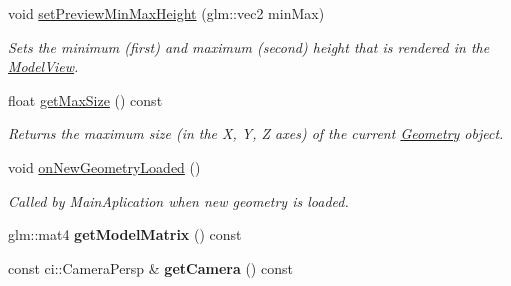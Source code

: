 \begin{DoxyCompactItemize}
\mbox{\label{classpepr3d_1_1_model_view_ac813369be27a029b6f2ecf32eae5c612}} 
void \mbox{\hyperlink{classpepr3d_1_1_model_view_ac813369be27a029b6f2ecf32eae5c612}{set\+Preview\+Min\+Max\+Height}} (glm\+::vec2 min\+Max)
\begin{DoxyCompactList}\small\item\em Sets the minimum (first) and maximum (second) height that is rendered in the \mbox{\hyperlink{classpepr3d_1_1_model_view}{Model\+View}}. \end{DoxyCompactList}\item 
\mbox{\label{classpepr3d_1_1_model_view_af9f8bb7d19cca89bc4cdfc8f958c0eaa}} 
float \mbox{\hyperlink{classpepr3d_1_1_model_view_af9f8bb7d19cca89bc4cdfc8f958c0eaa}{get\+Max\+Size}} () const
\begin{DoxyCompactList}\small\item\em Returns the maximum size (in the X, Y, Z axes) of the current \mbox{\hyperlink{classpepr3d_1_1_geometry}{Geometry}} object. \end{DoxyCompactList}\item 
\mbox{\label{classpepr3d_1_1_model_view_a324a3111305b1a127e61e628b1a8e066}} 
void \mbox{\hyperlink{classpepr3d_1_1_model_view_a324a3111305b1a127e61e628b1a8e066}{on\+New\+Geometry\+Loaded}} ()
\begin{DoxyCompactList}\small\item\em Called by Main\+Aplication when new geometry is loaded. \end{DoxyCompactList}\item 
\mbox{\label{classpepr3d_1_1_model_view_a6ae61178850cad2d5ca2621ed474c12d}} 
glm\+::mat4 {\bfseries get\+Model\+Matrix} () const
\item 
\mbox{\label{classpepr3d_1_1_model_view_abb14ac330c5a1b5618efa20624c07d42}} 
const ci\+::\+Camera\+Persp \& {\bfseries get\+Camera} () const
\end{DoxyCompactItemize}
